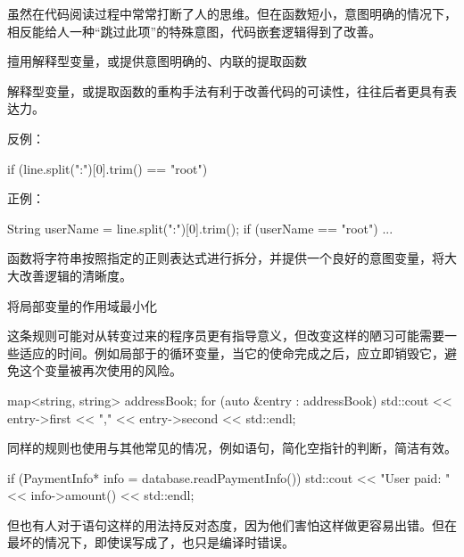 \begin{content}
虽然在代码阅读过程中常常打断了人的思维。但在函数短小，意图明确的情况下，相反能给人一种“跳过此项”的特殊意图，代码嵌套逻辑得到了改善。

\begin{regulation}
擅用解释型变量，或提供意图明确的、内联的提取函数
\end{regulation}

解释型变量，或提取函数的重构手法有利于改善代码的可读性，往往后者更具有表达力。

反例：
\begin{leftbar}
\begin{c++}
if (line.split(":")[0].trim() == "root")
\end{c++}
\end{leftbar}

正例：
\begin{leftbar}
\begin{c++}
String userName = line.split(":")[0].trim();
if (userName == "root")
{
    ...
}
\end{c++}
\end{leftbar}

函数将字符串按照指定的正则表达式进行拆分，并提供一个良好的意图变量，将大大改善逻辑的清晰度。

\begin{regulation}
将局部变量的作用域最小化
\end{regulation}

这条规则可能对从\clang{}转变过来的\cpp{}程序员更有指导意义，但改变这样的陋习可能需要一些适应的时间。例如局部于的循环变量，当它的使命完成之后，应立即销毁它，避免这个变量被再次使用的风险。

\begin{leftbar}
\begin{c++}
map<string, string> addressBook;
for (auto &entry : addressBook) 
{ 
    std::cout << entry->first << "," << entry->second << std::endl;
}
\end{c++}
\end{leftbar}

同样的规则也使用与其他常见的情况，例如语句，简化空指针的判断，简洁有效。

\begin{leftbar}
\begin{c++}
if (PaymentInfo* info = database.readPaymentInfo()) 
{
    std::cout << "User paid: " << info->amount() << std::endl;
}
\end{c++}
\end{leftbar}

但也有人对于语句这样的用法持反对态度，因为他们害怕这样做更容易出错。但在最坏的情况下，即使误写成了\ascii{==}，也只是编译时错误。

\end{content}
